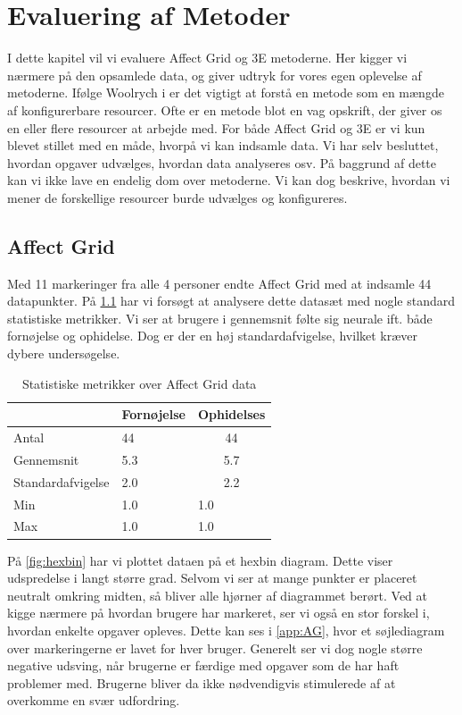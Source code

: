 \chapter{Evaluering af Metoder}\label{ch:evalmet}
I dette kapitel vil vi evaluere Affect Grid og 3E metoderne. Her kigger vi nærmere på den opsamlede data, og giver udtryk for vores egen oplevelse af metoderne. Ifølge Woolrych i \cite{Woolrych} er det vigtigt at forstå en metode som en mængde af konfigurerbare resourcer. Ofte er en metode blot en vag opskrift, der giver os en eller flere resourcer at arbejde med. For både Affect Grid og 3E er vi kun blevet stillet med en måde, hvorpå vi kan indsamle data. Vi har selv besluttet, hvordan opgaver udvælges, hvordan data analyseres osv. På baggrund af dette kan vi ikke lave en endelig dom over metoderne. Vi kan dog beskrive, hvordan vi mener de forskellige resourcer burde udvælges og konfigureres.

\section{Affect Grid}\label{sec:evalAG}
Med 11 markeringer fra alle 4 personer endte Affect Grid med at indsamle 44 datapunkter. På \cref{tab:AG} har vi forsøgt at analysere dette datasæt med nogle standard statistiske metrikker. Vi ser at brugere i gennemsnit følte sig neurale ift. både fornøjelse og ophidelse. Dog er der en høj standardafvigelse, hvilket kræver dybere undersøgelse.  

\begin{table}[]
\centering
\caption{Statistiske metrikker over Affect Grid data}
\label{tab:AG}
\begin{tabular}{|l|l|c|}
\hline
                  & Fornøjelse & Ophidelses               \\ \hline
Antal             & 44         & 44                       \\ \hline
Gennemsnit        & 5.3        & 5.7                      \\ \hline
Standardafvigelse & 2.0        & 2.2                      \\ \hline
Min               & 1.0        & \multicolumn{1}{l|}{1.0} \\ \hline
Max               & 1.0        & \multicolumn{1}{l|}{1.0} \\ \hline
\end{tabular}
\end{table}

På \cref{fig:hexbin} har vi plottet dataen på et hexbin diagram. Dette viser udspredelse i langt større grad. Selvom vi ser at mange punkter er placeret neutralt omkring midten, så bliver alle hjørner af diagrammet berørt. Ved at kigge nærmere på hvordan brugere har markeret, ser vi også en stor forskel i, hvordan enkelte opgaver opleves. Dette kan ses i \cref{app:AG}, hvor et søjlediagram over markeringerne er lavet for hver bruger. Generelt ser vi dog nogle større negative udsving, når brugerne er færdige med opgaver som de har haft problemer med. Brugerne bliver da ikke nødvendigvis stimulerede af at overkomme en svær udfordring. 

